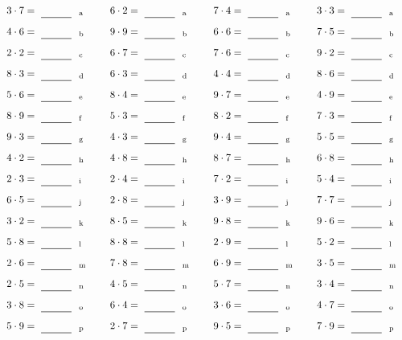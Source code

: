 \documentclass
[
  draft    = true,
  fontsize = 11pt,
  parskip  = half-
]
{scrartcl}
\begin{document}
\par\vfill\par
\begin{align*}
    \pline{3\cdot7}&=\rline{a}
  & \pline{6\cdot2}&=\rline{a}
  & \pline{7\cdot4}&=\rline{a}
  & \pline{3\cdot3}&=\rline{a} \\[1ex]
    \pline{4\cdot6}&=\rline{b}
  & \pline{9\cdot9}&=\rline{b}
  & \pline{6\cdot6}&=\rline{b}
  & \pline{7\cdot5}&=\rline{b} \\[1ex]
    \pline{2\cdot2}&=\rline{c}
  & \pline{6\cdot7}&=\rline{c}
  & \pline{7\cdot6}&=\rline{c}
  & \pline{9\cdot2}&=\rline{c} \\[1ex]
    \pline{8\cdot3}&=\rline{d}
  & \pline{6\cdot3}&=\rline{d}
  & \pline{4\cdot4}&=\rline{d}
  & \pline{8\cdot6}&=\rline{d} \\[1ex]
    \pline{5\cdot6}&=\rline{e}
  & \pline{8\cdot4}&=\rline{e}
  & \pline{9\cdot7}&=\rline{e}
  & \pline{4\cdot9}&=\rline{e} \\[1ex]
    \pline{8\cdot9}&=\rline{f}
  & \pline{5\cdot3}&=\rline{f}
  & \pline{8\cdot2}&=\rline{f}
  & \pline{7\cdot3}&=\rline{f} \\[1ex]
    \pline{9\cdot3}&=\rline{g}
  & \pline{4\cdot3}&=\rline{g}
  & \pline{9\cdot4}&=\rline{g}
  & \pline{5\cdot5}&=\rline{g} \\[1ex]
    \pline{4\cdot2}&=\rline{h}
  & \pline{4\cdot8}&=\rline{h}
  & \pline{8\cdot7}&=\rline{h}
  & \pline{6\cdot8}&=\rline{h} \\[1ex]
    \pline{2\cdot3}&=\rline{i}
  & \pline{2\cdot4}&=\rline{i}
  & \pline{7\cdot2}&=\rline{i}
  & \pline{5\cdot4}&=\rline{i} \\[1ex]
    \pline{6\cdot5}&=\rline{j}
  & \pline{2\cdot8}&=\rline{j}
  & \pline{3\cdot9}&=\rline{j}
  & \pline{7\cdot7}&=\rline{j} \\[1ex]
    \pline{3\cdot2}&=\rline{k}
  & \pline{8\cdot5}&=\rline{k}
  & \pline{9\cdot8}&=\rline{k}
  & \pline{9\cdot6}&=\rline{k} \\[1ex]
    \pline{5\cdot8}&=\rline{l}
  & \pline{8\cdot8}&=\rline{l}
  & \pline{2\cdot9}&=\rline{l}
  & \pline{5\cdot2}&=\rline{l} \\[1ex]
    \pline{2\cdot6}&=\rline{m}
  & \pline{7\cdot8}&=\rline{m}
  & \pline{6\cdot9}&=\rline{m}
  & \pline{3\cdot5}&=\rline{m} \\[1ex]
    \pline{2\cdot5}&=\rline{n}
  & \pline{4\cdot5}&=\rline{n}
  & \pline{5\cdot7}&=\rline{n}
  & \pline{3\cdot4}&=\rline{n} \\[1ex]
    \pline{3\cdot8}&=\rline{o}
  & \pline{6\cdot4}&=\rline{o}
  & \pline{3\cdot6}&=\rline{o}
  & \pline{4\cdot7}&=\rline{o} \\[1ex]
    \pline{5\cdot9}&=\rline{p}
  & \pline{2\cdot7}&=\rline{p}
  & \pline{9\cdot5}&=\rline{p}
  & \pline{7\cdot9}&=\rline{p}
\end{align*}
\end{document}
